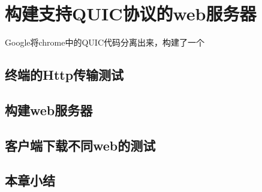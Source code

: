 \chapter{构建支持QUIC协议的web服务器}
Google将chrome中的QUIC代码分离出来，构建了一个
\section{终端的Http传输测试}
\section{构建web服务器}
\section{客户端下载不同web的测试}
\section{本章小结}